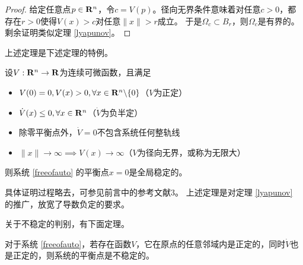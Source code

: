 \begin{proof}
  给定任意点$p\in\mathbf{R}{}^n$，令$c=V(p)$。径向无界条件意味着对任意$c>0$，都存在$r>0$使得$V(x)>c$对任意$\|x\|>r$成立。
  于是$\Omega_c\subset B_r$，则$\Omega_c$是有界的。剩余证明类似定理 \ref{lyapunov}。
\end{proof}
上述定理是下述定理的特例。
\begin{theorem}
  设$V:\mathbf{R}{}^n\to\mathbf{R}$为连续可微函数，且满足
    \begin{itemize}[leftmargin=1em]
      \item $V(0)=0,V(x)>0,\forall x\in \mathbf{R}{}^n\backslash\{0\}$（$V$为正定）
      \item $\dot{V}(x)\le 0,\forall x\in \mathbf{R}{}^n$（$\dot{V}$为负半定）
      \item 除零平衡点外，$\dot{V}=0$不包含系统任何整轨线
      \item $\|x\|\to\infty\implies V(x)\to \infty$（$V$为径向无界，或称为无限大）
    \end{itemize}
  则系统 \eqref{freeofauto} 的平衡点$x=0$是全局稳定的。
\end{theorem}
具体证明过程略去，可参见前言中的参考文献3。
上述定理是对定理 \ref{lyapunov} 的推广，放宽了导数负定的要求。

关于不稳定的判别，有下面定理。
\begin{theorem}[不稳定性判别定理]\label{unstable}
  对于系统 \eqref{freeofauto}，若存在函数$V$，它在原点的任意邻域内是正定的，同时$\dot{V}$也是正定的，则系统的平衡点是不稳定的。
\end{theorem}